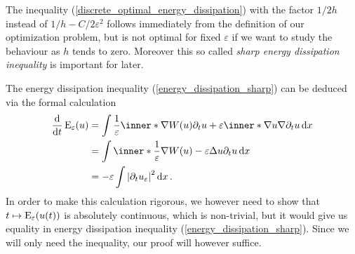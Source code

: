 \begin{remark}
	The inequality (\ref{discrete_optimal_energy_dissipation}) with the factor $ 1/2h $ instead of $ 1/h- C/2\varepsilon^{ 2 } $ follows immediately from the definition of our optimization problem, but is not optimal for fixed $ \varepsilon $ if we want to study the behaviour as $ h $ tends to zero. Moreover this so called \emph{sharp energy dissipation inequality} is important for later.
\end{remark}

\begin{remark}
	The energy dissipation inequality (\ref{energy_dissipation_sharp}) can be deduced via the formal calculation 
	\begin{align*}
		\dv{ t } \energy_{ \varepsilon } ( u )
		& =
		\int
			\frac{ 1 }{\varepsilon }
			\inner*{ \nabla W ( u ) }{ \partial_{ t } u }
			+
			\varepsilon
			\inner*{ \nabla u  }{ \nabla \partial_{ t } u }
		\dd{ x }
		\\
		& = 
		\int
			\inner*{ \frac{ 1 }{ \varepsilon } \nabla W ( u ) - \varepsilon \Delta u }{ \partial_{ t } u }
		\dd{ x }
		\\
		& =
		- \varepsilon \int \abs{ \partial_{ t } u_{ \varepsilon } }^{ 2 } \dd{ x }.
	\end{align*}
	In order to make this calculation rigorous, we however need to show that $ t \mapsto \operatorname{E}_{ \varepsilon } ( u ( t ) ) $ is absolutely continuous, which is non-trivial, but it would give us equality in energy dissipation inequality (\ref{energy_dissipation_sharp}).
	Since we will only need the inequality, our proof will however suffice.
\end{remark}







